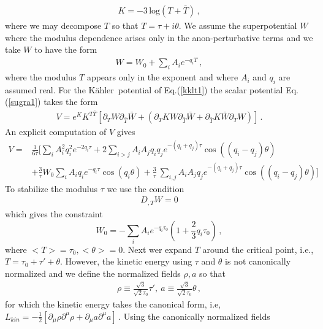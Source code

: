 \documentclass[12pt]{article}
\def\non{\nonumber\\}
\def\K{K\"ahler~}
\begin{document}
\begin{align}
K = -3 \, \text{log}(T+ \bar T)\,,
\label{kklt1}
\end{align}
where we may decompose $T$ so that 
$T= \tau + i \theta$.
We assume  the superpotential $W$ where the modulus dependence arises only in the  anon-perturbative terms 
and we take  $W$ to have the form 
\begin{align}
W= W_0 +\sum_{i} A_i  e^{- q_iT}\,,
\label{w0A}
\end{align}
where the modulus $T$ appears only in the exponent and  where $A_i$ and $q_i$ are assumed real.
For the \K potential of Eq.(\ref{kklt1}) the scalar potential Eq. (\ref{sugra1}) takes the form 
%
\begin{align}
V=  e^K K^{T\bar T} \left[\partial_TW \partial_{\bar T} \bar W +
 (\partial_TK   W \partial_{\bar T} \bar W + 
  \partial_{\bar  T} K  \bar W \partial_{T}  W) \right]\,.
 \end{align}
An  explicit computation of $V$ gives 
 \begin{align} 
V= &\frac{1}{6\tau} \Big [  \sum_{i} A^2_i q^2_i  e^{- 2q_i \tau } + 2 \sum_{i>j} A_iA_j q_iq_j e^{-(q_i+q_j)\tau} \cos\left((q_i-q_j) \theta\right)\non
&+  \frac{3}{\tau}  W_0 \sum_i A_i q_i e^{-q_i \tau} \cos(q_i \theta)
 +  \frac{3}{\tau} \ 
  \sum_{i,j}  A_i A_j q_j  e^{-(q_i + q_j) \tau} \cos((q_i -q_j)\theta)
\Big]
\label{11}
\end{align} 
 To stabilize the modulus $\tau$ we use the condition~\cite{Nath:1983aw} 
 \begin{align}
 D_{,T} W =0 
 \label{33.1}
 \end{align}
 which gives the constraint
\begin{equation}\label{eqn:crit}
W_0 = -\sum_i A_i e^{-q_i\tau_0} \left(1 + \frac{2}{3} q_i \tau_0\right)\, ,
\end{equation}
where $<T>=\tau_0, <\theta>=0$.   
Next wer  expand $T$  around the critical point, i.e.,  
$T= \tau_0 + \tau' +  \theta$. However, the kinetic energy  using  $\tau$ and $\theta$ is not canonically normalized
and  we define the normalized fields $\rho, a$ so that 
\begin{align}
\rho \equiv \frac{\sqrt 3}{\sqrt 2 \tau_0} \tau',~ a \equiv  \frac{\sqrt 3}{\sqrt 2 \tau_0}\theta\,,
\label{19}
\end{align}
for which the kinetic energy takes the canonical  form, i.e, 
$L_{kin}=
- \frac{1}{2}
\left[\partial_\mu \rho \partial^\mu \rho + \partial_\mu a \partial^\mu a\right]\,.$  Using the canonically normalized fields
\end{document}

